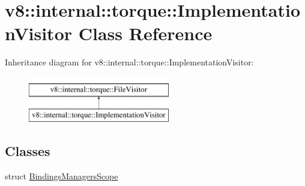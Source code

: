 \hypertarget{classv8_1_1internal_1_1torque_1_1ImplementationVisitor}{}\section{v8\+:\+:internal\+:\+:torque\+:\+:Implementation\+Visitor Class Reference}
\label{classv8_1_1internal_1_1torque_1_1ImplementationVisitor}
Inheritance diagram for v8\+:\+:internal\+:\+:torque\+:\+:Implementation\+Visitor\+:\begin{figure}[H]
\begin{center}
\leavevmode
\includegraphics[height=2.000000cm]{classv8_1_1internal_1_1torque_1_1ImplementationVisitor}
\end{center}
\end{figure}
\subsection*{Classes}
\begin{DoxyCompactItemize}
\item 
struct \mbox{\hyperlink{structv8_1_1internal_1_1torque_1_1ImplementationVisitor_1_1BindingsManagersScope}{Bindings\+Managers\+Scope}}
\end{DoxyCompactItemize}
